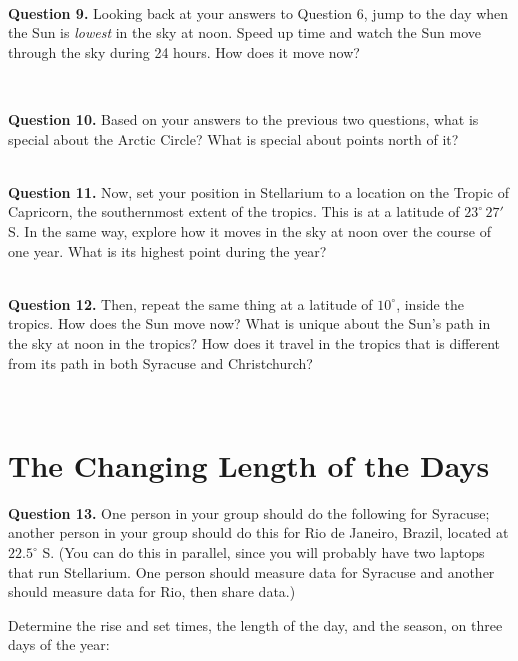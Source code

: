 \documentclass[11pt]{article}
\begin{document}
\vspace*{1.5cm}
\hrulefill\\


\textbf{Question 9.} 
Looking back at your answers to Question 6, jump to the day when the Sun is {\it lowest} in the sky at noon. Speed up time and watch
the Sun move through the sky during 24 hours. How does it move now?


\vspace*{1.5cm}
\hrulefill\\
\newpage

\textbf{Question 10.} 
Based on your answers to the previous two questions, what is special about the Arctic Circle? What is special about points north
of it?

\vspace*{1.5cm}
\hrulefill\\

\textbf{Question 11.} 
Now, set your position in Stellarium to a location on the Tropic of Capricorn, the southernmost extent of the tropics.
This is at a latitude of $23^\circ\,27'$ S. In the same way, explore how it moves in the sky at noon over the course of one
year. What is its highest point during the year?

\vspace*{1.5cm}
\hrulefill\\

\textbf{Question 12.}
Then, repeat the same thing at a latitude of $10^\circ$, inside the tropics.
How does the Sun move now? What is unique about the Sun's path in the sky at noon in the tropics? How does it travel in the tropics that is different from its path in both Syracuse and Christchurch?

\vspace*{1.5cm}
\hrulefill\\
\newpage
\section{The Changing Length of the Days}

\textbf{Question 13.}
One person in your group should do the following for Syracuse; another person in your group should do 
this for Rio de Janeiro, Brazil, located at $22.5^\circ$ S. (You can do this in parallel, since you will probably 
have two laptops that run Stellarium. One person should measure data for Syracuse and another should measure data for Rio, then share data.) 

Determine the rise and set times, the length of the day, and the season, on three days of the year:
\end{document}
